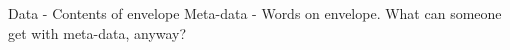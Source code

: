 Data - Contents of envelope
Meta-data - Words on envelope.
What can someone get with meta-data, anyway?
